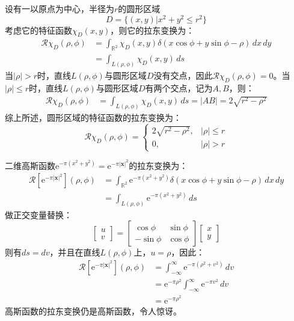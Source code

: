 \documentclass{ctexbook}
\begin{document}
\begin{example}[圆形特征函数的拉东变换]
    设有一以原点为中心，半径为$r$的圆形区域$$D=\{(x,y)|x^2+y^2\leq r^2\}$$
    考虑它的特征函数$\chi_D(x,y)$，则它的拉东变换为：
    \begin{align*}
        \mathcal{R} \chi_D(\rho,\phi)&=\int_{\mathbb{R}^2}\chi_D(x,y)\delta(x\cos\phi+y\sin\phi-\rho)\,dx\,dy\\
        &=\int_{L(\rho,\phi)}\chi_D(x,y)\,ds
    \end{align*}
    当$|\rho|>r$时，直线$L(\rho,\phi)$与圆形区域$D$没有交点，因此$\mathcal{R} \chi_D(\rho,\phi)=0$。当$|\rho|\leq r$时，直线$L(\rho,\phi)$与圆形区域$D$有两个交点，记为$A,B$，则：
    \begin{align*}
        \mathcal{R} \chi_D(\rho,\phi)&=\int_{L(\rho,\phi)}\chi_D(x,y)\,ds=|AB|=2\sqrt{r^2-\rho^2}
    \end{align*}
    综上所述，圆形区域的特征函数的拉东变换为：
    \[\mathcal{R} \chi_D(\rho,\phi)=\begin{cases}
        2\sqrt{r^2-\rho^2},&|\rho|\leq r\\
        0,&|\rho|>r
    \end{cases}\]
\end{example}
\begin{example}[高斯函数的拉东变换]
    二维高斯函数$\mathrm{e}^{-\pi(x^2+y^2)}=\mathrm{e}^{-\pi|\mathbf{x}|^2}$的拉东变换为：
    \begin{align*}
        \mathcal{R} [\mathrm{e}^{-\pi|\mathbf{x}|^2}](\rho,\phi)&=\int_{\mathbb{R}^2}\mathrm{e}^{-\pi(x^2+y^2)}\delta(x\cos\phi+y\sin\phi-\rho)\,dx\,dy\\
        &=\int_{L(\rho,\phi)}\mathrm{e}^{-\pi(x^2+y^2)}\,ds
    \end{align*}
    做正交变量替换：
    \[\begin{bmatrix}u\\v\end{bmatrix}=\begin{bmatrix}
        \cos\phi & \sin\phi\\
        -\sin\phi & \cos\phi
    \end{bmatrix}\begin{bmatrix}x\\y\end{bmatrix}\]
    则有$ds=dv$，并且在直线$L(\rho,\phi)$上，$u=\rho$，因此：
    \begin{align*}
        \mathcal{R} [\mathrm{e}^{-\pi|\mathbf{x}|^2}](\rho,\phi)&=\int_{-\infty}^{\infty}\mathrm{e}^{-\pi(\rho^2+v^2)}\,dv\\
        &=\mathrm{e}^{-\pi \rho^2}\int_{-\infty}^{\infty}\mathrm{e}^{-\pi v^2}\,dv\\
        &=\mathrm{e}^{-\pi \rho^2}
    \end{align*}
    高斯函数的拉东变换仍是高斯函数，令人惊讶。
\end{example}
\end{document}
